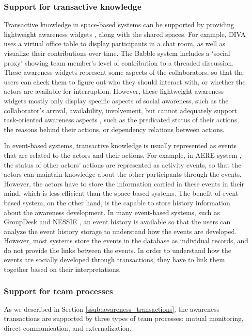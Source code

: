 \subsubsection{Support for transactive knowledge} %
\label{ssub:support_for_transactive_knowledge}
Transactive knowledge in space-based systems can be supported by providing lightweight awareness widgets \cite{Gutwin1996}, along with the shared spaces. For example, DIVA uses a virtual office table to display participants in a chat room, as well as visualize their contributions over time\cite{Berlage1999}. The Babble system \cite{Erickson1999} includes a `social proxy' showing team member's level of contribution to a threaded discussion. These awareness widgets represent some aspects of the collaborators, so that the users can check them to figure out who they should interact with, or whether the actors are available for interruption. However, these lightweight awareness widgets mostly only display specific aspects of social awareness, such as the collaborator's arrival, availability, involvement, but cannot adequately support task-oriented awareness aspects \cite{carroll2003a}, such as the predicated status of their actions, the reasons behind their actions, or dependency relations between actions.

In event-based systems, transactive knowledge is usually represented as events that are related to the actors and their actions. For example, in AERE system \cite{fuchs1999a}, the status of other actors' actions are represented as activity events, so that the actors can maintain knowledge about the other participants through the events. However, the actors have to store the information carried in these events in their mind, which is less efficient than the space-based systems. The benefit of event-based system, on the other hand, is the capable to store history information about the awareness development. In many event-based systems, such as GroupDesk \cite{Fuchs1995} and NESSIE \cite{prinz1999a}, an event history is available so that the users can analyze the event history storage to understand how the events are developed. However, most systems store the events in the database as individual records, and do not provide the links between the events. In order to understand how the events are socially developed through transactions, they have to link them together based on their interpretations. 

\subsubsection{Support for team processes} %
\label{ssub:support_for_team_processes}
As we described in Section \ref{ssub:awareness_transactions}, the awareness transactions are supported by three types of team processes: mutual monitoring, direct communication, and externalization.


